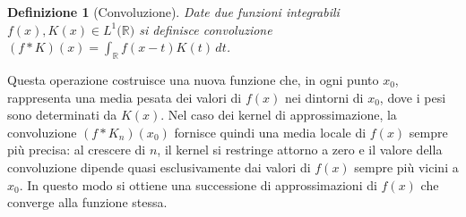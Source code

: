 \documentclass[a4paper,12pt]{report}
\newtheorem{definizione}{Definizione}[chapter]
\begin{document}
\begin{definizione}[Convoluzione]\label{def: 3.23}
    Date due funzioni integrabili $f(x),K(x)\in L^1(\mathbb{R)}$ si definisce convoluzione $(f*K)(x)=\displaystyle\int_\mathbb{R}f(x-t)K(t)\,dt$.
\end{definizione}

Questa operazione costruisce una nuova funzione che, in ogni punto $x_0$, rappresenta una media pesata dei valori di $f(x)$ nei dintorni di $x_0$, dove i pesi sono determinati da $K(x)$. Nel caso dei kernel di approssimazione, la convoluzione $(f*K_n)(x_0)$ fornisce quindi una media locale di $f(x)$ sempre più precisa: al crescere di $n$, il kernel si restringe attorno a zero e il valore della convoluzione dipende quasi esclusivamente dai valori di $f(x)$ sempre più vicini a $x_0$. In questo modo si ottiene una successione di approssimazioni di $f(x)$ che converge alla funzione stessa.

\newpage
\end{document}
